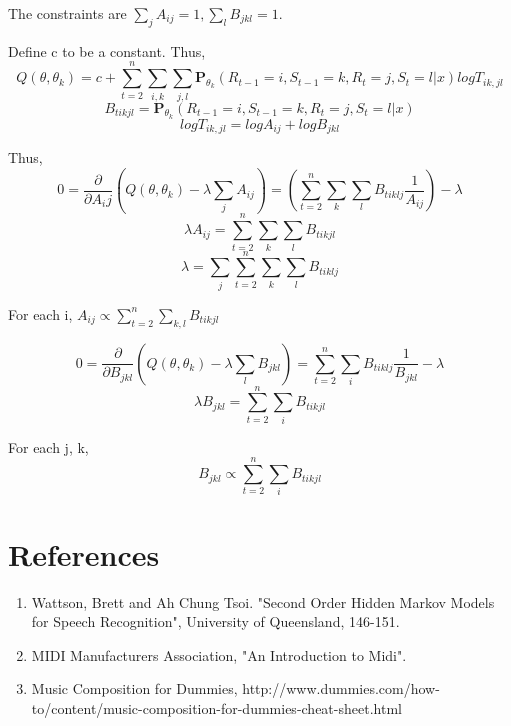 \documentclass{article} %
\begin{document}
The constraints are $\sum_j A_{ij} = 1, \sum_l B_{jkl} = 1.$ \newline

Define c to be a constant. Thus,  \newline
$$Q(\theta, \theta_k) = c + \sum_{t=2}^n \sum_{i,k} \sum_{j,l} \textbf{P}_{\theta_k} (R_{t-1} = i, S_{t-1} = k, R_t = j, S_t = l | x) log T_{ik, jl}$$ 
$$B_{tikjl} = \textbf{P}_{\theta_k} (R_{t-1} = i, S_{t-1} = k, R_t = j, S_t = l | x)$$
$$log T_{ik, jl} = log A_{ij} + log B_{jkl}$$

Thus, \newline
$$ 0 = \frac{\partial}{\partial A_ij}(Q(\theta, \theta_k) - \lambda \sum_{j} A_{ij}) = (\sum_{t=2}^n \sum_k \sum_l B_{tiklj} \frac{1}{A_{ij}}) - \lambda$$
$$\lambda A_{ij} = \sum_{t=2}^n \sum_k \sum_l B_{tikjl}$$
$$\lambda = \sum_j \sum_{t=2}^n \sum_k \sum_l B_{tiklj}$$

For each i, $A_{ij} \propto \sum_{t=2}^n \sum_{k,l} B_{tikjl}$ \newline

$$ 0 = \frac{\partial}{\partial B_{jkl}} (Q(\theta, \theta_k) - \lambda \sum_l B_{jkl}) = \sum_{t=2}^n \sum_i B_{tiklj} \frac{1}{B_{jkl}} - \lambda$$
$$ \lambda B_{jkl} = \sum_{t=2}^n \sum_i B_{tikjl}$$

For each j, k, \newline
$$B_{jkl} \propto \sum_{t=2}^n \sum_i B_{tikjl}$$

\newpage

\section{References}
\begin{enumerate}
\item Wattson, Brett and Ah Chung Tsoi. "Second Order Hidden Markov Models for Speech Recognition", University of Queensland, 146-151. 
\item MIDI Manufacturers Association, "An Introduction to Midi". 
\item Music Composition for Dummies, http://www.dummies.com/how-to/content/music-composition-for-dummies-cheat-sheet.html
\end{enumerate}
\end{document}

